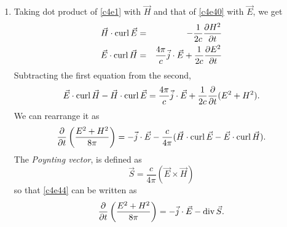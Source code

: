 \begin{enumerate}
\item Taking dot product of \eqref{c4e1} with $\vec{H}$ and that of \eqref{c4e40}
with $\vec{E}$, we get
\begin{eqnarray*}
\vec{H}\cdot\operatorname{curl}\vec{E} &=& -\frac{1}{2c}\frac{\partial{H^2}}{\partial{t}} \\
\vec{E}\cdot\operatorname{curl}\vec{H} &=& \frac{4\pi}{c}\vec{j}\cdot\vec{E} + \frac{1}{2c}\frac{\partial{E^2}}{\partial{t}}
\end{eqnarray*}
Subtracting the first equation from the second,
\begin{equation}\label{c4e43}
\vec{E}\cdot\operatorname{curl}\vec{H} - \vec{H}\cdot\operatorname{curl}\vec{E} = \frac{4\pi}{c}\vec{j}\cdot\vec{E}
+ \frac{1}{2c}\frac{\partial}{\partial t}(E^2 + H^2).
\end{equation}
We can rearrange it as
\begin{equation}\label{c4e44}
\frac{\partial}{\partial t}\left(\frac{E^2 + H^2}{8\pi}\right) = 
-\vec{j}\cdot\vec{E} - 
\frac{c}{4\pi}(\vec{H}\cdot\operatorname{curl}\vec{E} - \vec{E}\cdot\operatorname{curl}\vec{H}).
\end{equation}
The \emph{Poynting vector}, is defined as
\begin{equation}\label{c4e45}
\vec{S} = \frac{c}{4\pi}(\vec{E} \times \vec{H})
\end{equation}
so that \eqref{c4e44} can be written as
\begin{equation}\label{c4e46}
\frac{\partial}{\partial t}\left(\frac{E^2 + H^2}{8\pi}\right) = 
-\vec{j}\cdot\vec{E} - \operatorname{div}\vec{S}.
\end{equation}


\end{enumerate}
